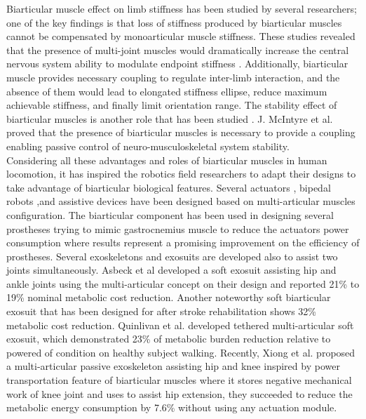 \documentclass[10pt,letterpaper]{article}
\begin{document}
Biarticular muscle effect on limb stiffness has been studied by several researchers\cite{69,70}; one of the key findings is that loss of stiffness produced by biarticular muscles cannot be compensated by monoarticular muscle stiffness\cite{69,70}. These studies revealed that the presence of multi-joint muscles would dramatically increase the central nervous system ability to modulate endpoint stiffness \cite{70,71}. Additionally, biarticular muscle provides necessary coupling to regulate inter-limb interaction\cite{72}, and the absence of them would lead to elongated stiffness ellipse, reduce maximum achievable stiffness, and finally limit orientation range\cite{69}.
The stability effect of biarticular muscles is another role that has been studied \cite{73,74,76}. J. McIntyre et al. \cite{73} proved that the presence of biarticular muscles is necessary to provide a coupling enabling passive control of neuro-musculoskeletal system stability.\\

Considering all these advantages and roles of biarticular muscles in human locomotion, it has inspired the robotics field researchers to adapt their designs to take advantage of biarticular biological features\cite{53}. Several actuators \cite{77,78}, bipedal robots\cite{74,75,76} ,and assistive devices\cite{53} have been designed based on multi-articular muscles configuration.
The biarticular component has been used in designing several prostheses trying to mimic gastrocnemius muscle to reduce the actuators power consumption\cite{82,83,84,86,87} where results represent a promising improvement on the efficiency of prostheses\cite{87}. Several exoskeletons and exosuits are developed also to assist two joints simultaneously\cite{43,47,49,79,80,81}. Asbeck et al\cite{47} developed a soft exosuit assisting hip and ankle joints using the multi-articular concept on their design and reported 21\% to 19\% nominal metabolic cost reduction. Another noteworthy soft biarticular exosuit that has been designed for after stroke rehabilitation shows 32\% metabolic cost reduction\cite{43}. Quinlivan et al. \cite{80}  developed tethered multi-articular soft exosuit, which demonstrated 23\% of metabolic burden reduction relative to powered of condition on healthy subject walking. Recently, Xiong et al. \cite{88} proposed a multi-articular passive exoskeleton assisting hip and knee inspired by power transportation feature of biarticular muscles where it stores negative mechanical work of knee joint and uses to assist hip extension, they succeeded to reduce the metabolic energy consumption by 7.6\% without using any actuation module.\\
\end{document}

